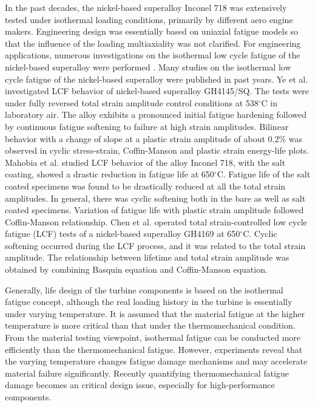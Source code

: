 In the past decades, the nickel-based superalloy Inconel 718 was extensively tested under isothermal loading conditions, primarily by different aero engine makers. Engineering design was essentially based on uniaxial fatigue models so that the influence of the loading multiaxiality was not clarified.
For engineering applications, numerous investigations on the isothermal low cycle fatigue of the nickel-based superalloy were performed \cite{Koch85, Morrow88, Mahobia2014, Chen2016175, kim1988elevated, nelson1992creep}.
Many studies on the isothermal low cycle fatigue of the nickel-based superalloy were published in past years.
Ye et al. \cite{ye2004low} investigated LCF behavior of nickel-based superalloy GH4145/SQ. The tests were under fully reversed total strain amplitude control conditions at 538$^{\circ}$C in laboratory air. The alloy exhibits a pronounced initial fatigue hardening followed by continuous fatigue softening to failure at high strain amplitudes. Bilinear behavior with a change of slope at a plastic strain amplitude of about $0.2\%$ was observed in cyclic stress-strain, Coffin-Manson and plastic strain energy-life plots.
Mahobia et al. \cite{mahobia2014effect} studied LCF behavior of the alloy Inconel 718, with the salt coating, showed a drastic reduction in fatigue life at 650$^{\circ}$C. Fatigue life of the salt coated specimens was found to be drastically reduced at all the total strain amplitudes. In general, there was cyclic softening both in the bare as well as salt coated specimens. Variation of fatigue life with plastic strain amplitude followed Coffin-Manson relationship.
Chen et al. \cite{Chen2016175} operated total strain-controlled low cycle fatigue (LCF) tests of a nickel-based superalloy GH4169 at 650$^{\circ}$C. Cyclic softening occurred during the LCF process, and it was related to the total strain amplitude. The relationship between lifetime and total strain amplitude was obtained by combining Basquin equation and Coffin-Manson equation.

Generally, life design of the turbine components is based on the isothermal fatigue concept, although the real loading history in the turbine is essentially under varying temperature. It is assumed that the material fatigue at the higher temperature is more critical than that under the thermomechanical condition. From the material testing viewpoint, isothermal fatigue can be conducted more efficiently than the thermomechanical fatigue. However, experiments reveal that the varying temperature changes fatigue damage mechanisms and may accelerate material failure significantly. Recently quantifying thermomechanical fatigue damage becomes an critical design issue, especially for high-performance components.

